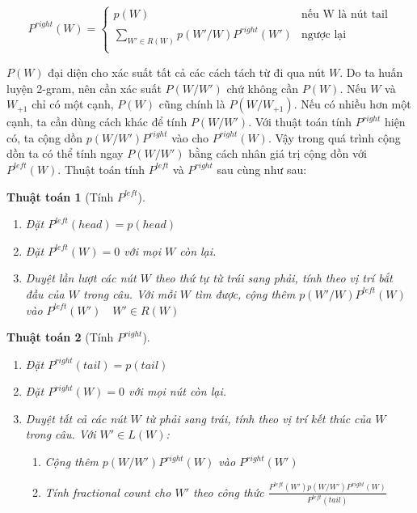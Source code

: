 \documentclass[a4paper,oneside]{book} %
\theoremstyle{break}
\newtheorem{algo}{Thuật toán}
\begin{document}
$$
P^{right}(W) = \left\{
    \begin{array}{ll}
      p(W)&\text{nếu W là nút tail}\\
      \displaystyle\sum_{W' \in R(W)}p(W'/W)P^{right}(W')&\text{ngược lại}\\
    \end{array}
  \right.
$$

$P(W)$ đại diện cho xác suất tất cả các cách tách từ đi qua nút
$W$. Do ta huấn luyện 2-gram, nên cần xác suất $P(W/W')$ chứ không cần
$P(W)$. Nếu $W$ và $W_{+1}$ chỉ có một cạnh, $P(W)$ cũng chính là
$P(W/W_{+1})$. Nếu có nhiều hơn một cạnh, ta cần dùng cách khác để
tính $P(W/W')$. Với thuật toán tính $P^{right}$ hiện có, ta cộng dồn
$p(W/W')P^{right}$ vào cho $P^{right}(W)$. Vậy trong quá trình cộng
dồn ta có thể tính ngay $P(W/W')$ bằng cách nhân giá trị cộng dồn với
$P^{left}(W)$. Thuật toán tính $P^{left}$ và $P^{right}$ sau cùng như
sau:

\begin{algo}[Tính $P^{left}$]
\begin{enumerate}
\item Đặt $P^{left}(head) = p(head)$
\item Đặt $P^{left}(W) = 0$ với mọi $W$ còn lại.
\item Duyệt lần lượt các nút $W$ theo thứ tự từ trái sang phải, tính
  theo vị trí bắt đầu của $W$ trong câu.
  Với mỗi $W$ tìm được, cộng thêm $p(W'/W)P^{left}(W)$ vào $P^{left}(W')\quad
  W' \in R(W)$
\end{enumerate}
\end{algo}

\begin{algo}[Tính $P^{right}$]
\begin{enumerate}
\item Đặt $P^{right}(tail) = p(tail)$
\item Đặt $P^{right}(W) = 0$ với mọi nút còn lại.
\item Duyệt tất cả các nút $W$ từ phải sang trái, tính theo vị trí kết
  thúc của $W$ trong câu. Với $W' \in L(W)$:
  \begin{enumerate}
  \item Cộng thêm $p(W/W')P^{right}(W)$ vào $P^{right}(W')$
  \item Tính fractional count cho $W'$ theo công thức
    $\displaystyle\frac{P^{left}(W')p(W/W')P^{right}(W)}{P^{left}(tail)}$
  \end{enumerate}
\end{enumerate}
\end{algo}
\end{document}
